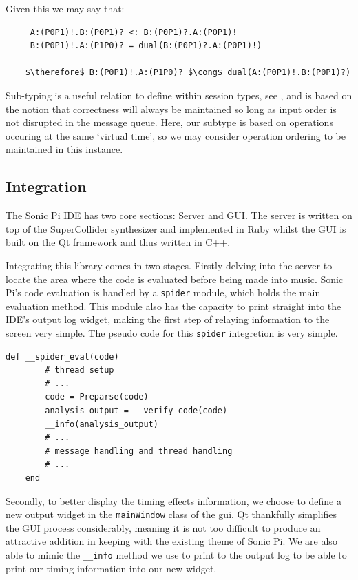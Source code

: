 \documentclass[11pt, abstracton, twoside, titlepage=true]{scrartcl}
\def\therefore{
	\leavevmode
	\lower0.4ex\hbox{$\cdot$}
	\kern-.5em\raise0.7ex\hbox{$\cdot$}
	\kern-0.55em\lower0.4ex\hbox{$\cdot$}
	\thinspace
}
\begin{document}
Given this we may say that:
\\
\begin{lstlisting}
     A:(P0P1)!.B:(P0P1)? <: B:(P0P1)?.A:(P0P1)!
     B:(P0P1)!.A:(P1P0)? = dual(B:(P0P1)?.A:(P0P1)!)

    $\therefore$ B:(P0P1)!.A:(P1P0)? $\cong$ dual(A:(P0P1)!.B:(P0P1)?)
\end{lstlisting}

Sub-typing is a useful relation to define within session types, see 
\cite{HYC08, MY15, MYH09}, and is based on the notion that correctness will 
always be maintained so long as input order is not disrupted in the message 
queue. Here, our subtype is based on operations occuring at the same `virtual 
time', so we may consider operation ordering to be maintained in this instance. 

\subsection{Integration}

The Sonic Pi IDE has two core sections: Server and GUI. The server is written on 
top of the SuperCollider synthesizer and implemented in Ruby whilst the GUI is 
built on the Qt framework and thus written in C++.

Integrating this library comes in two stages. Firstly delving into the server to 
locate the area where the code is evaluated before being made into music. Sonic 
Pi's code evaluation is handled by a \texttt{spider} module, which holds the main 
evaluation method. This module also has the capacity to print straight into the 
IDE's output log widget, making the first step of relaying information to the 
screen very simple. The pseudo code for this \texttt{spider} integretion is very
simple.
\\
\begin{lstlisting}[style = sonicpi]
    def __spider_eval(code)
        # thread setup
        # ...
        code = Preparse(code)
        analysis_output = __verify_code(code)
        __info(analysis_output)
        # ...
        # message handling and thread handling
        # ...
    end
\end{lstlisting}

Secondly, to better display the timing effects information, we choose to define 
a new output widget in the \texttt{mainWindow} class of the gui. Qt thankfully 
simplifies the GUI process considerably, meaning it is not too difficult to produce
an attractive addition in keeping with the existing theme of Sonic Pi. We are 
also able to mimic the \texttt{\_\_info} method we use to print to the output log
to be able to print our timing information into our new widget.
\end{document}
